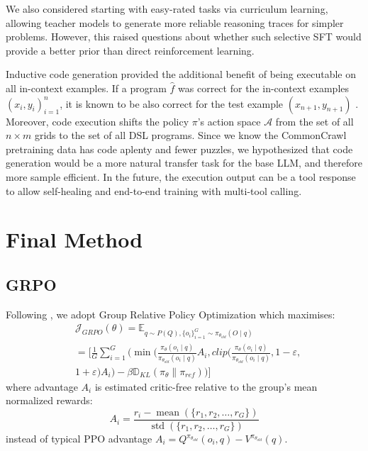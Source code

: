 \documentclass{article}
\begin{document}
We also considered starting with easy-rated tasks via curriculum learning, allowing teacher models to generate more reliable reasoning traces for simpler problems. However, this raised questions about whether such selective SFT would provide a better prior than direct reinforcement learning.

Inductive code generation provided the additional benefit of being executable on all in-context examples. If a program $\hat{f}$ was correct for the in-context examples $(x_i, y_i)_{i=1}^n$, it is known to be also correct for the test example $(x_{n+1}, y_{n+1})$ \cite{Hodel}. Moreover, code execution shifts the policy $\pi$'s action space $\mathcal{A}$ from the set of all $n \times m$ grids to the set of all DSL programs. Since we know the CommonCrawl pretraining data has code aplenty and fewer puzzles, we hypothesized that code generation would be a more natural transfer task for the base LLM, and therefore more sample efficient. In the future, the execution output can be a tool response to allow self-healing and end-to-end training with multi-tool calling.

\section{Final Method}

\subsection{GRPO}

Following \cite{r1,GRPO}, we adopt Group Relative Policy Optimization which maximises:
\begin{align*}
   & \mathcal{J}_{GRPO}(\theta)  = \mathbb{E}_{q \sim P(Q), \{o_i\}_{i=1}^G \sim \pi_{\theta_{old}}(O \mid q)}                                                                                   \\
   & = [ \frac{1}{G} \sum_{i=1}^G ( \min ( \frac{\pi_\theta(o_i \mid q)}{\pi_{\theta_{old}}(o_i \mid q)} A_i, clip(\frac{\pi_\theta(o_i \mid q)}{\pi_{\theta_{old}}(o_i \mid q)}, 1-\varepsilon,
  \\ & 1+\varepsilon) A_i ) - \beta \mathbb{D}_{KL}(\pi_\theta \| \pi_{ref}) ) ]
\end{align*}
where advantage $A_i$ is estimated critic-free relative to the group's mean normalized rewards:
$$
  A_i = \frac{r_i - \operatorname{mean}(\{r_1, r_2, \ldots, r_G\})}{\operatorname{std}(\{r_1, r_2, \ldots, r_G\})}
$$
instead of typical PPO advantage $A_i = Q^{\pi_{\theta_{old}}}(o_i, q) - V^{\pi_{\theta_{old}}}(q)$.
\end{document}
